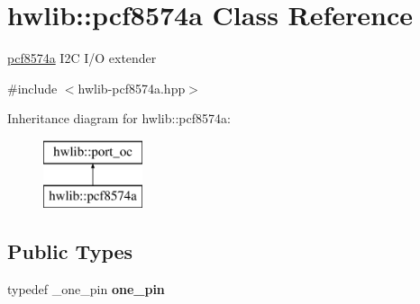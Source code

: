 \hypertarget{classhwlib_1_1pcf8574a}{}\section{hwlib\+:\+:pcf8574a Class Reference}
\label{classhwlib_1_1pcf8574a}


\hyperlink{classhwlib_1_1pcf8574a}{pcf8574a} I2C I/O extender  




{\ttfamily \#include $<$hwlib-\/pcf8574a.\+hpp$>$}

Inheritance diagram for hwlib\+:\+:pcf8574a\+:\begin{figure}[H]
\begin{center}
\leavevmode
\includegraphics[height=2.000000cm]{classhwlib_1_1pcf8574a}
\end{center}
\end{figure}
\subsection*{Public Types}
\begin{DoxyCompactItemize}
\item 
typedef \+\_\+one\+\_\+pin {\bfseries one\+\_\+pin}\hypertarget{classhwlib_1_1pcf8574a_a626b4018d37bde301afe4cfa2e21cd2e}{}\label{classhwlib_1_1pcf8574a_a626b4018d37bde301afe4cfa2e21cd2e}

\end{DoxyCompactItemize}
